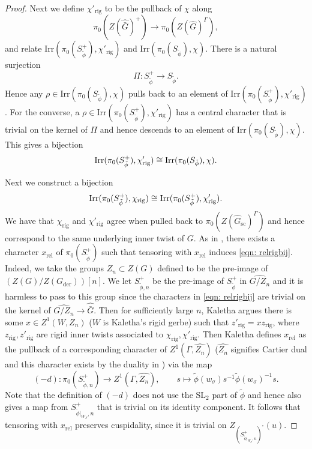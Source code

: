 \documentclass{amsart}
\theoremstyle{definition}
\theoremstyle{remark}
\numberwithin{equation}{section}
\newcommand{\der}{\mathrm{der}}
\newcommand{\Sc}{\mathrm{sc}}
\newcommand{\SL}{\mathrm{SL}}
\newcommand{\Irr}{\mathrm{Irr}}
\newcommand{\rel}{\mathrm{rel}}
\newcommand{\wh}{\widehat}
\newcommand{\rig}{\mathrm{rig}}
\begin{document}
\begin{proof}
Next we define $\chi'_{\rig}$ to be the pullback of $\chi$ along 
\begin{equation*}
    \pi_0(Z(\wh{\bar{G}})^+) \rightarrow \pi_0(Z(\wh{G})^{\Gamma}),
\end{equation*}
and relate $\Irr(\pi_0(S^+_{\tilde{\phi}}), \chi'_{\rig})$ and $\Irr(\pi_0(S_{\tilde{\phi}}), \chi)$. There is a natural surjection
\begin{equation*}
    \Pi\colon S^+_{\tilde{\phi}} \rightarrow S_{\tilde{\phi}}.
\end{equation*}
 Hence any $\rho \in \Irr(\pi_0(S_{\tilde{\phi}}), \chi)$ pulls back to an element of $\Irr(\pi_0(S^+_{\tilde{\phi}}), \chi'_{\rig})$. For the converse, a $\rho \in \Irr(\pi_0(S^+_{\tilde{\phi}}), \chi'_{\rig})$ has a central character that is trivial on the kernel of $\Pi$ and hence descends to an element of $\Irr(\pi_0(S_{\tilde{\phi}}), \chi)$. This gives a bijection
 \begin{equation}{\label{eqn: purevsrig}}
     \Irr(\pi_0(S^+_{\tilde{\phi}}), \chi'_{\rig}) \cong \Irr(\pi_0(S_{\tilde{\phi}}), \chi).
 \end{equation}

Next we construct a bijection
\begin{equation}{\label{eqn: relrigbij}}
    \Irr(\pi_0(S^+_{\tilde{\phi}}), \chi_{\rig}) \cong \Irr(\pi_0(S^+_{\tilde{\phi}}), \chi'_{\rig}).
\end{equation}
We have that $\chi_{\rig}$ and $\chi'_{\rig}$ agree when pulled back to $\pi_0(Z(\wh{G}_{\Sc})^{\Gamma})$ and hence correspond to the same underlying inner twist of $G$. As in \cite[\S6.3]{KallocalBGvsRig}, there exists a character $x_{\rel}$ of $\pi_0(S^+_{\tilde{\phi}})$ such that tensoring with $x_{\rel}$ induces \eqref{eqn: relrigbij}. Indeed, we take the groups $Z_n \subset Z(G)$ defined to be the pre-image of $(Z(G)/Z(G_{\der}))[n]$. We let $S^+_{\tilde{\phi}, n}$ be the pre-image of $S^+_{\tilde{\phi}}$ in $\wh{G / Z_n}$ and it is harmless to pass to this group since the characters in \eqref{eqn: relrigbij} are trivial on the kernel of $\wh{G/Z_n} \rightarrow \wh{\bar{G}}$. Then for sufficiently large $n$, Kaletha argues there is some $x \in Z^1(W, Z_n)$ ($W$ is Kaletha's rigid gerbe) such that $z'_{\rig} = xz_{\rig}$, where $z_{\rig}, z'_{\rig}$ are rigid inner twists associated to $\chi_{\rig}, \chi'_{\rig}$. Then Kaletha defines $x_{\rel}$ as the pullback of a corresponding character of $Z^1(\Gamma, \wh{Z_n})$ ($\wh{Z_n}$ signifies Cartier dual and this character exists by the duality in \cite[\S6.2]{KallocalBGvsRig}) via the map 
\begin{equation*}
    (-d)\colon \pi_0(S^+_{\tilde{\phi}, n}) \rightarrow Z^1(\Gamma, \wh{Z_n}), \qquad s \mapsto \tilde{\phi}(w_{\sigma})s^{-1}\tilde{\phi}(w_{\sigma})^{-1}s.
\end{equation*}
Note that the definition of $(-d)$ does not use the $\SL_2$ part of $\tilde{\phi}$ and hence also gives a map from $S^+_{\tilde{\phi}|_{W_F}, n}$ that is trivial on its identity component. It follows that tensoring with $x_{\rel}$ preserves cuspidality, since it is trivial on $Z_{(S^+_{\tilde{\phi}|_{W_F}, n})^{\circ}}(u)$.



\end{proof}
\end{document}
